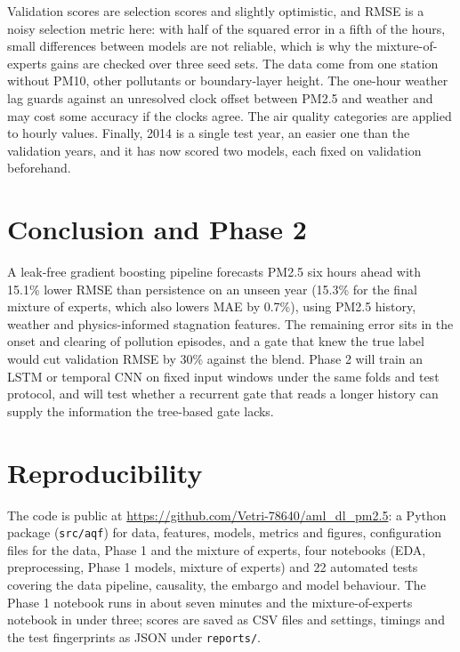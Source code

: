 \documentclass[conference]{IEEEtran}
\begin{document}
Validation scores are selection scores and slightly optimistic, and RMSE is a noisy selection metric here: with half of the squared error in a fifth of the hours, small differences between models are not reliable, which is why the mixture-of-experts gains are checked over three seed sets. The data come from one station without PM10, other pollutants or boundary-layer height. The one-hour weather lag guards against an unresolved clock offset between PM2.5 and weather and may cost some accuracy if the clocks agree. The air quality categories are applied to hourly values. Finally, 2014 is a single test year, an easier one than the validation years, and it has now scored two models, each fixed on validation beforehand.

\section{Conclusion and Phase 2}
A leak-free gradient boosting pipeline forecasts PM2.5 six hours ahead with 15.1\% lower RMSE than persistence on an unseen year (15.3\% for the final mixture of experts, which also lowers MAE by 0.7\%), using PM2.5 history, weather and physics-informed stagnation features. The remaining error sits in the onset and clearing of pollution episodes, and a gate that knew the true label would cut validation RMSE by 30\% against the blend. Phase 2 will train an LSTM or temporal CNN on fixed input windows under the same folds and test protocol, and will test whether a recurrent gate that reads a longer history can supply the information the tree-based gate lacks.

\section*{Reproducibility}
The code is public at \url{https://github.com/Vetri-78640/aml_dl_pm2.5}: a Python package (\texttt{src/aqf}) for data, features, models, metrics and figures, configuration files for the data, Phase 1 and the mixture of experts, four notebooks (EDA, preprocessing, Phase 1 models, mixture of experts) and 22 automated tests covering the data pipeline, causality, the embargo and model behaviour. The Phase 1 notebook runs in about seven minutes and the mixture-of-experts notebook in under three; scores are saved as CSV files and settings, timings and the test fingerprints as JSON under \texttt{reports/}.
\end{document}
